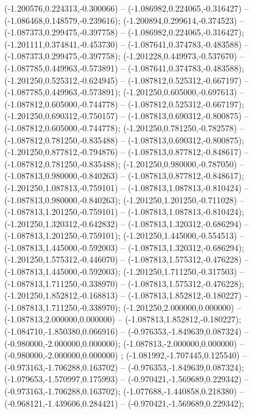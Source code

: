  (-1.200576,0.224313,-0.300066) -- (-1.086982,0.224065,-0.316427) -- (-1.086468,0.148579,-0.239616);
 (-1.200894,0.299614,-0.374523) -- (-1.087373,0.299475,-0.397758) -- (-1.086982,0.224065,-0.316427);
 (-1.201111,0.374841,-0.453730) -- (-1.087641,0.374783,-0.483588) -- (-1.087373,0.299475,-0.397758);
 (-1.201228,0.449973,-0.537670) -- (-1.087785,0.449963,-0.573891) -- (-1.087641,0.374783,-0.483588);
 (-1.201250,0.525312,-0.624945) -- (-1.087812,0.525312,-0.667197) -- (-1.087785,0.449963,-0.573891);
 (-1.201250,0.605000,-0.697613) -- (-1.087812,0.605000,-0.744778) -- (-1.087812,0.525312,-0.667197);
 (-1.201250,0.690312,-0.750157) -- (-1.087813,0.690312,-0.800875) -- (-1.087812,0.605000,-0.744778);
 (-1.201250,0.781250,-0.782578) -- (-1.087812,0.781250,-0.835488) -- (-1.087813,0.690312,-0.800875);
 (-1.201250,0.877812,-0.794876) -- (-1.087813,0.877812,-0.848617) -- (-1.087812,0.781250,-0.835488);
 (-1.201250,0.980000,-0.787050) -- (-1.087813,0.980000,-0.840263) -- (-1.087813,0.877812,-0.848617);
 (-1.201250,1.087813,-0.759101) -- (-1.087813,1.087813,-0.810424) -- (-1.087813,0.980000,-0.840263);
 (-1.201250,1.201250,-0.711028) -- (-1.087813,1.201250,-0.759101) -- (-1.087813,1.087813,-0.810424);
 (-1.201250,1.320312,-0.642832) -- (-1.087813,1.320312,-0.686294) -- (-1.087813,1.201250,-0.759101);
 (-1.201250,1.445000,-0.554513) -- (-1.087813,1.445000,-0.592003) -- (-1.087813,1.320312,-0.686294);
 (-1.201250,1.575312,-0.446070) -- (-1.087813,1.575312,-0.476228) -- (-1.087813,1.445000,-0.592003);
 (-1.201250,1.711250,-0.317503) -- (-1.087813,1.711250,-0.338970) -- (-1.087813,1.575312,-0.476228);
 (-1.201250,1.852812,-0.168813) -- (-1.087813,1.852812,-0.180227) -- (-1.087813,1.711250,-0.338970);
 (-1.201250,2.000000,0.000000) -- (-1.087813,2.000000,0.000000) -- (-1.087813,1.852812,-0.180227);
 (-1.084710,-1.850380,0.066916) -- (-0.976353,-1.849639,0.087324) -- (-0.980000,-2.000000,0.000000);
 (-1.087813,-2.000000,0.000000) -- (-0.980000,-2.000000,0.000000) ;
 (-1.081992,-1.707445,0.125540) -- (-0.973163,-1.706288,0.163702) -- (-0.976353,-1.849639,0.087324);
 (-1.079653,-1.570997,0.175993) -- (-0.970421,-1.569689,0.229342) -- (-0.973163,-1.706288,0.163702);
 (-1.077688,-1.440858,0.218380) -- (-0.968121,-1.439606,0.284421) -- (-0.970421,-1.569689,0.229342);
